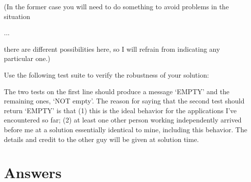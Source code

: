 (In the former case you will need to do something to avoid problems
in the situation
\begin{lcode}
 \iffalse ... \ifempty{...} ... \fi ... \fi
\end{lcode}
there
are different possibilities here, so I will refrain from
indicating any particular one.)

Use the following test suite to verify the robustness of your
solution:

\begin{lcode}
\long{}

 \test{}                            \test{ }
                         \test{-}
 \test{$}                           \test{\empty}
 \test{\endinput}                   \test{\iftrue a\else b\fi}
 \test{\else}                       \test{#}
 \test{\par}                        \halign{#\cr\test{&}\cr}
 \test{\relax}                      \test{\relax\relax\relax}
 \expandafter\iffalse{}\fi    \test{{}}
\end{lcode}

The two tests on the first line should produce a message `EMPTY' and
the remaining ones, `NOT empty'. The reason for saying that the second
test should return `EMPTY' is that (1) this is the ideal behavior for
the applications I've encountered so far; (2) at least one other person
working independently arrived before me at a solution essentially
identical to mine, including this behavior. The details and credit to
the other guy will be given at solution time.



\section{Answers}


\begin{comment}

[Posted to info-tex on 25 Oct 91; see answer.001]
"*** Exercise 2 (hard):
"Define an "ifempty" macro that takes one argument and resolves
"essentially to \iftrue if the argument is empty, and \iffalse
"otherwise. This is useful for handling arguments given by
"users to commands defined in a macro package such as LaTeX.
"
"Plain TeX or LaTeX-style solutions are both acceptable, that
"is,
"
"     \ifempty{...}TRUE CASE\else FALSE CASE\fi
"
"or
"
"     \ifempty{...}{TRUE CASE}{FALSE CASE}
\end{comment}

